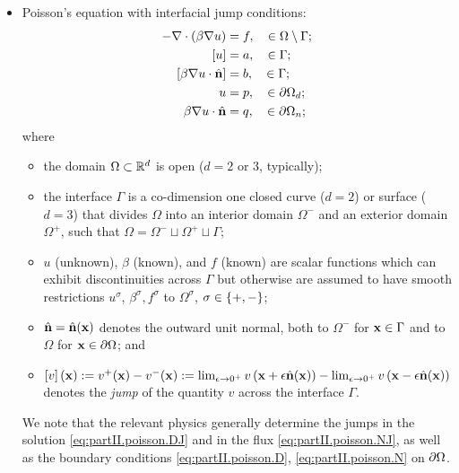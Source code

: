 \begin{itemize}

\item Poisson's equation with interfacial jump conditions:
\begin{subequations} \label{eq:partII.poisson}
\begin{align}
-\nabla \cdot \left( \beta \nabla u \right) & = f, \quad \in \Omega \setminus \Gamma; \label{eq:partII.poisson.PDE} \\
\left[ u \right] & = a, \quad \in \Gamma; \label{eq:partII.poisson.DJ} \\
\left[ \beta \nabla u \cdot \hat{\mathbf{n}} \right] & = b, \quad \in \Gamma; \label{eq:partII.poisson.NJ} \\
u & = p, \quad \in \partial\Omega_d; \label{eq:partII.poisson.D} \\
\beta \nabla u \cdot \hat{\mathbf{n}} & = q, \quad \in \partial\Omega_n; \label{eq:partII.poisson.N}
\end{align}
\end{subequations}
where
\begin{itemize}
\item the domain $\Omega \subset \mathbb{R}^d$ is open ($d = 2 \text{ or } 3$, typically);
\item the interface $\Gamma$ is a co-dimension one closed curve ($d = 2$) or surface ($d = 3$) that divides $\Omega$ into an interior domain $\Omega^-$ and an exterior domain $\Omega^+$, such that $\Omega = \Omega^- \sqcup \Omega^+ \sqcup \Gamma$;
\item $u$ (unknown), $\beta$ (known), and $f$ (known) are scalar functions which can exhibit discontinuities across $\Gamma$ but otherwise are assumed to have smooth restrictions $u^{\sigma}$, $\beta^{\sigma}, f^{\sigma}$ to $\Omega^{\sigma}$, $\sigma \in \left\lbrace +,- \right\rbrace$;
\item $\hat{\mathbf{n}} = \hat{\mathbf{n}}(\mathbf{x})$ denotes the outward unit normal, both to $\Omega^-$ for $\mathbf{x} \in \Gamma$ and to $\Omega$ for $\mathbf{x} \in \partial\Omega$; and
\item $\left[ v \right](\mathbf{x}) := v^+(\mathbf{x}) - v^-(\mathbf{x}) := \lim_{\epsilon \to 0^+} v\left( \mathbf{x} + \epsilon \hat{\mathbf{n}}(\mathbf{x}) \right) - \lim_{\epsilon \to 0^+} v\left( \mathbf{x} - \epsilon \hat{\mathbf{n}}(\mathbf{x}) \right)$ denotes the \emph{jump} of the quantity $v$ across the interface $\Gamma$.
\end{itemize}
We note that the relevant physics generally determine the jumps in the solution \eqref{eq:partII.poisson.DJ} and in the flux \eqref{eq:partII.poisson.NJ}, as well as the boundary conditions \eqref{eq:partII.poisson.D}, \eqref{eq:partII.poisson.N} on $\partial\Omega$.


\end{itemize}
